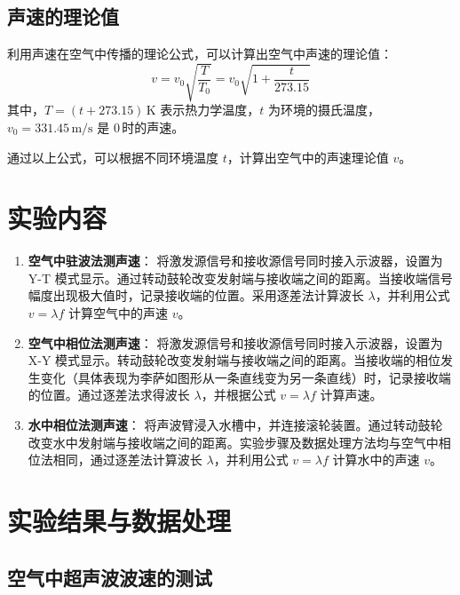 \documentclass[UTF-8,twoside,cs4size]{ctexart}
\begin{document}
\subsection{声速的理论值}

利用声速在空气中传播的理论公式，可以计算出空气中声速的理论值：
\[
v = v_0 \sqrt{\frac{T}{T_0}} = v_0 \sqrt{1 + \frac{t}{273.15}}
\]
其中，$T = (t + 273.15)\,\mathrm{K}$ 表示热力学温度，$t$ 为环境的摄氏温度，$v_0 = 331.45\,\mathrm{m/s}$ 是 $0$\,\textcelsius 时的声速。

通过以上公式，可以根据不同环境温度 $t$，计算出空气中的声速理论值 $v$。

\section{实验内容}
\begin{enumerate}
    \item \textbf{空气中驻波法测声速}：  
    将激发源信号和接收源信号同时接入示波器，设置为 Y-T 模式显示。通过转动鼓轮改变发射端与接收端之间的距离。当接收端信号幅度出现极大值时，记录接收端的位置。采用逐差法计算波长 $\lambda$，并利用公式 $v = \lambda f$ 计算空气中的声速 $v$。

    \item \textbf{空气中相位法测声速}：  
    将激发源信号和接收源信号同时接入示波器，设置为 X-Y 模式显示。转动鼓轮改变发射端与接收端之间的距离。当接收端的相位发生变化（具体表现为李萨如图形从一条直线变为另一条直线）时，记录接收端的位置。通过逐差法求得波长 $\lambda$，并根据公式 $v = \lambda f$ 计算声速。

    \item \textbf{水中相位法测声速}：  
    将声波臂浸入水槽中，并连接滚轮装置。通过转动鼓轮改变水中发射端与接收端之间的距离。实验步骤及数据处理方法均与空气中相位法相同，通过逐差法计算波长 $\lambda$，并利用公式 $v = \lambda f$ 计算水中的声速 $v$。
\end{enumerate}

\section{实验结果与数据处理}
\subsection{空气中超声波波速的测试}
\end{document}
